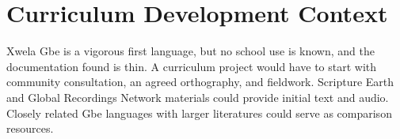 \documentclass[12pt]{article}
\begin{document}
\section{Curriculum Development Context}
Xwela Gbe is a vigorous first language, but no school use is known, and the documentation found is thin. A curriculum project would have to start with community consultation, an agreed orthography, and fieldwork. Scripture Earth and Global Recordings Network materials could provide initial text and audio. Closely related Gbe languages with larger literatures could serve as comparison resources.
\end{document}
